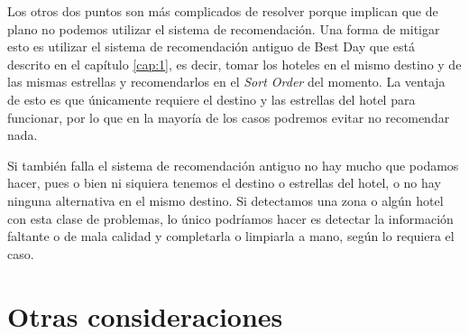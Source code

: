 \documentclass[12pt]{report}
\begin{document}
Los otros dos puntos son más complicados de resolver porque implican que de plano no podemos utilizar el sistema de recomendación. Una forma de mitigar esto es utilizar el sistema de recomendación antiguo de Best Day que está descrito en el capítulo \ref{cap:1}, es decir, tomar los hoteles en el mismo destino y de las mismas estrellas y recomendarlos en el \emph{Sort Order} del momento. La ventaja de esto es que únicamente requiere el destino y las estrellas del hotel para funcionar, por lo que en la mayoría de los casos podremos evitar no recomendar nada.

Si también falla el sistema de recomendación antiguo no hay mucho que podamos hacer, pues o bien ni siquiera tenemos el destino o estrellas del hotel, o no hay ninguna alternativa en el mismo destino. Si detectamos una zona o algún hotel con esta clase de problemas, lo único podríamos hacer es detectar la información faltante o de mala calidad y completarla o limpiarla a mano, según lo requiera el caso.


\section{Otras consideraciones}
\end{document}

